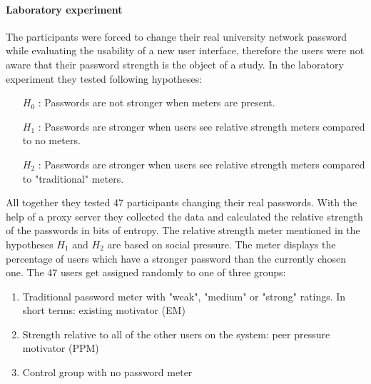 \documentclass[12pt,a4paper]{article}
\begin{document}

\paragraph{Laboratory experiment} 

The participants were forced to change their real university network password while evaluating the usability of a new user interface, therefore the users were not aware that their password strength is the object of a study. In the laboratory experiment they tested following hypotheses:
\begin{itemize}
    \item [$ H _{0}$]: Passwords are not stronger when meters are present.
    \item [$ H _{1}$]: Passwords are stronger when users see relative strength meters	compared to no meters.
    \item [$ H _{2}$]: Passwords are stronger when users see relative strength meters compared to "traditional" meters.
\end{itemize} 
All together they tested 47 participants changing their real passwords. With the help of a proxy server they collected the data and calculated the relative strength of the passwords in bits of entropy. The relative strength meter mentioned in the hypotheses $ H _{1}$ and $ H _{2}$ are based on social pressure. The meter displays the percentage of users which have a stronger password than the currently chosen one. The 47 users get assigned randomly to one of three groups: 

\begin{enumerate}
	\item Traditional password meter with "weak", "medium" or "strong" ratings. In short terms: existing motivator (EM)
	\item Strength relative to all of the other users on the system: peer pressure motivator (PPM)
	\item Control group with no password meter
\end{enumerate}

\end{document}
